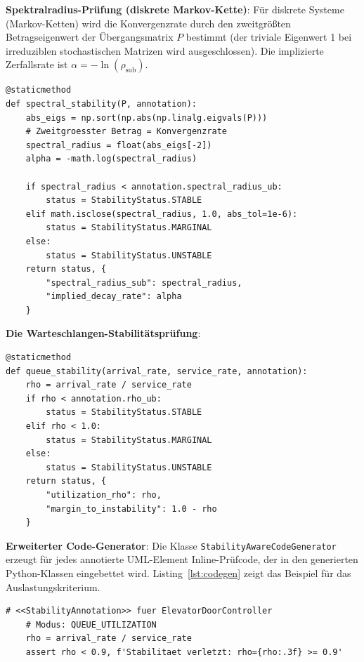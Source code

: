 ﻿\documentclass[a4paper,12pt]{report}
\theoremstyle{definition}
\begin{document}
\textbf{Spektralradius-Prüfung (diskrete Markov-Kette)}:
Für diskrete Systeme (Markov-Ketten) wird die Konvergenzrate durch den
zweitgrößten Betragseigenwert der Übergangsmatrix $P$ bestimmt
(der triviale Eigenwert 1 bei irreduziblen stochastischen Matrizen wird
ausgeschlossen). Die implizierte Zerfallsrate ist
$\alpha = -\ln(\rho_{\text{sub}})$.

\begin{lstlisting}[style=python,
	caption={Spektralradius-Stabilitätsprüfung für Markov-Ketten},
	label={lst:spectral}]
@staticmethod
def spectral_stability(P, annotation):
	abs_eigs = np.sort(np.abs(np.linalg.eigvals(P)))
	# Zweitgroesster Betrag = Konvergenzrate
	spectral_radius = float(abs_eigs[-2])
	alpha = -math.log(spectral_radius)
	
	if spectral_radius < annotation.spectral_radius_ub:
		status = StabilityStatus.STABLE
	elif math.isclose(spectral_radius, 1.0, abs_tol=1e-6):
		status = StabilityStatus.MARGINAL
	else:
		status = StabilityStatus.UNSTABLE
	return status, {
		"spectral_radius_sub": spectral_radius,
		"implied_decay_rate": alpha
	}
\end{lstlisting}

\textbf{Die Warteschlangen-Stabilitätsprüfung}:
\begin{lstlisting}[style=python,
	caption={Auslastungsprüfung für M/M/1-Warteschlangen},
	label={lst:queue}]
@staticmethod
def queue_stability(arrival_rate, service_rate, annotation):
	rho = arrival_rate / service_rate
	if rho < annotation.rho_ub:
		status = StabilityStatus.STABLE
	elif rho < 1.0:
		status = StabilityStatus.MARGINAL
	else:
		status = StabilityStatus.UNSTABLE
	return status, {
		"utilization_rho": rho,
		"margin_to_instability": 1.0 - rho
	}
\end{lstlisting}

\textbf{Erweiterter Code-Generator}:
Die Klasse \texttt{StabilityAwareCodeGenerator} erzeugt für jedes annotierte
UML-Element Inline-Prüfcode, der in den generierten Python-Klassen
eingebettet wird. Listing~\ref{lst:codegen} zeigt das Beispiel für das
Auslastungskriterium.

\begin{lstlisting}[style=python,
	caption={Generierter Stabilitäts-Check-Code (Auslastungsmodus)},
	label={lst:codegen}]
	# <<StabilityAnnotation>> fuer ElevatorDoorController
	# Modus: QUEUE_UTILIZATION
	rho = arrival_rate / service_rate
	assert rho < 0.9, f'Stabilitaet verletzt: rho={rho:.3f} >= 0.9'
\end{lstlisting}
\end{document}
